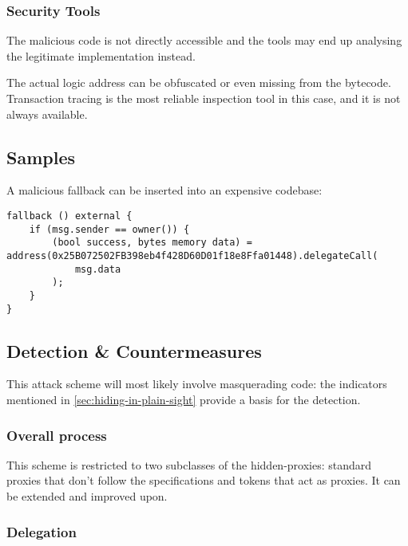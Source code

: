 \subsubsection{Security Tools}

The malicious code is not directly accessible and the tools may end up analysing the legitimate implementation instead.

The actual logic address can be obfuscated or even missing from the bytecode.
Transaction tracing is the most reliable inspection tool in this case, and it is not always available.

\subsection{Samples}

A malicious fallback can be inserted into an expensive codebase:

\begin{lstlisting}[language=Solidity]
fallback () external {
    if (msg.sender == owner()) {
        (bool success, bytes memory data) = address(0x25B072502FB398eb4f428D60D01f18e8Ffa01448).delegateCall(
            msg.data
        );
    }
}
\end{lstlisting}

\subsection{Detection \& Countermeasures}

This attack scheme will most likely involve masquerading code: the indicators mentioned in \ref{sec:hiding-in-plain-sight} provide a basis for the detection.

\subsubsection{Overall process}

\hspace*{-1.5cm}


This scheme is restricted to two subclasses of the hidden-proxies: standard proxies that don't follow the specifications and tokens that act as proxies.
It can be extended and improved upon.

\subsubsection{Delegation}

